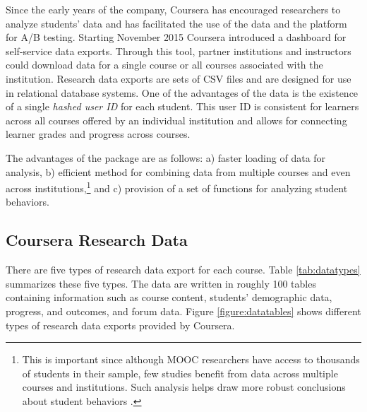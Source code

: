 Since the early years of the company, Coursera has encouraged
researchers to analyze students' data and has facilitated the use of the
data and the platform for A/B testing. Starting November 2015 Coursera
introduced a dashboard for self-service data exports. Through this tool,
partner institutions and instructors could download data for a single
course or all courses associated with the institution. Research data
exports are sets of CSV files and are designed for use in relational
database systems. One of the advantages of the data is the existence of
a single \emph{hashed user ID} for each student. This user ID is
consistent for learners across all courses offered by an individual
institution and allows for connecting learner grades and progress across
courses.

The advantages of the package are as follows: a) faster loading of data
for analysis, b) efficient method for combining data from multiple
courses and even across
institutions,\footnote{This is important since although MOOC researchers have access to thousands of students in their sample, few studies benefit from data across multiple courses and institutions. Such analysis helps draw more robust conclusions about student behaviors \citep{reich2015rebooting}.}
and c) provision of a set of functions for analyzing student behaviors.

\subsection{Coursera Research Data}\label{coursera-research-data}

There are five types of research data export for each course. Table
\ref{tab:datatypes} summarizes these five types. The data are written in
roughly 100 tables containing information such as course content,
students' demographic data, progress, and outcomes, and forum data.
Figure \ref{figure:datatables} shows different types of research data
exports provided by Coursera.

